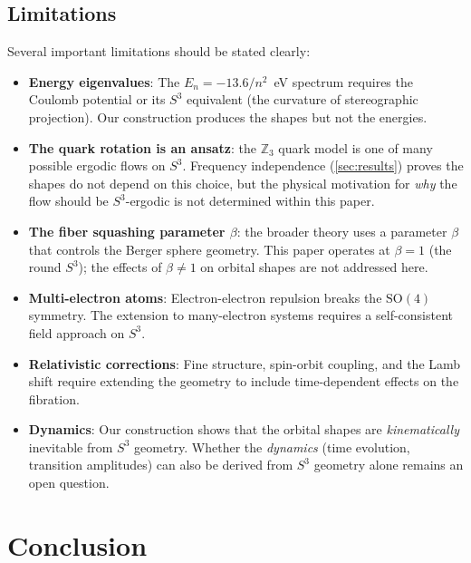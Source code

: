 \documentclass[12pt, a4paper]{article}
\theoremstyle{definition}
\theoremstyle{remark}
\newcommand{\Sthree}{S^3}
\newcommand{\SO}{\mathrm{SO}}
\newcommand{\Z}{\mathbb{Z}}
\begin{document}
\subsection{Limitations}

Several important limitations should be stated clearly:

\begin{itemize}[nosep]
  \item \textbf{Energy eigenvalues}: The $E_n = -13.6/n^2$~eV spectrum
    requires the Coulomb potential or its $\Sthree$ equivalent (the
    curvature of stereographic projection). Our construction produces
    the shapes but not the energies.
  \item \textbf{The quark rotation is an ansatz}: the $\Z_3$ quark model
    is one of many possible ergodic flows on $\Sthree$. Frequency
    independence (\cref{sec:results}) proves the shapes do not depend on
    this choice, but the physical motivation for \emph{why} the flow should
    be $\Sthree$-ergodic is not determined within this paper.
  \item \textbf{The fiber squashing parameter $\beta$}: the broader theory
    uses a parameter $\beta$ that controls the Berger sphere geometry. This
    paper operates at $\beta = 1$ (the round $\Sthree$); the effects of
    $\beta \neq 1$ on orbital shapes are not addressed here.
  \item \textbf{Multi-electron atoms}: Electron-electron repulsion breaks
    the $\SO(4)$ symmetry. The extension to many-electron systems requires
    a self-consistent field approach on $\Sthree$.
  \item \textbf{Relativistic corrections}: Fine structure, spin-orbit
    coupling, and the Lamb shift require extending the geometry to include
    time-dependent effects on the fibration.
  \item \textbf{Dynamics}: Our construction shows that the orbital shapes
    are \emph{kinematically} inevitable from $\Sthree$ geometry. Whether
    the \emph{dynamics} (time evolution, transition amplitudes) can also be
    derived from $\Sthree$ geometry alone remains an open question.
\end{itemize}


\section{Conclusion}
\label{sec:conclusion}
\end{document}
